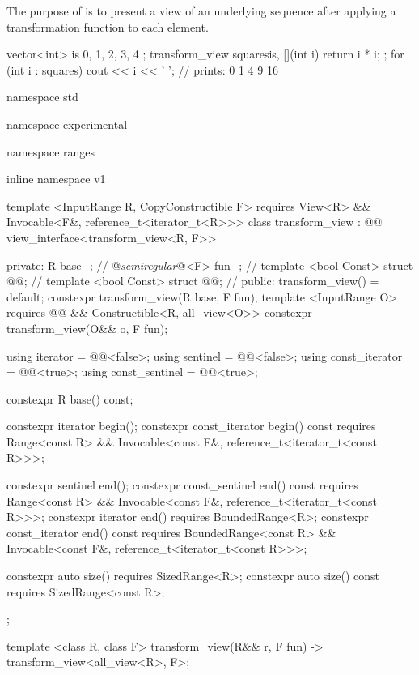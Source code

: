 \pnum
The purpose of  is to present a view of an underlying
sequence after applying a transformation function to each element.

\pnum
\enterexample
\begin{codeblock}
vector<int> is{ 0, 1, 2, 3, 4 };
transform_view squares{is, [](int i) { return i * i; }};
for (int i : squares)
  cout << i << ' '; // prints: 0 1 4 9 16
\end{codeblock}
\exitexample

\begin{codeblock}
namespace std { namespace experimental { namespace ranges { inline namespace v1 {
  template <InputRange R, CopyConstructible F>
    requires View<R> && Invocable<F&, reference_t<iterator_t<R>>>
  class transform_view : @@ view_interface<transform_view<R, F>> {
  private:
    R base_; // \expos
    @\textit{semiregular}@<F> fun_; // \expos
    template <bool Const>
      struct @@; // \expos
    template <bool Const>
      struct @@; // \expos
  public:
    transform_view() = default;
    constexpr transform_view(R base, F fun);
    template <InputRange O>
      requires @@ &&
          Constructible<R, all_view<O>>
    constexpr transform_view(O&& o, F fun);

    using iterator = @@<false>;
    using sentinel = @@<false>;
    using const_iterator = @@<true>;
    using const_sentinel = @@<true>;

    constexpr R base() const;

    constexpr iterator begin();
    constexpr const_iterator begin() const requires Range<const R> &&
      Invocable<const F&, reference_t<iterator_t<const R>>>;

    constexpr sentinel end();
    constexpr const_sentinel end() const requires Range<const R> &&
      Invocable<const F&, reference_t<iterator_t<const R>>>;
    constexpr iterator end() requires BoundedRange<R>;
    constexpr const_iterator end() const requires BoundedRange<const R> &&
      Invocable<const F&, reference_t<iterator_t<const R>>>;

    constexpr auto size() requires SizedRange<R>;
    constexpr auto size() const requires SizedRange<const R>;
  };

  template <class R, class F>
  transform_view(R&& r, F fun) -> transform_view<all_view<R>, F>;
}}}}
\end{codeblock}

